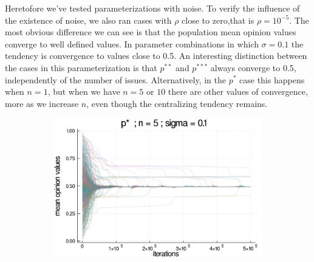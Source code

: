 \documentclass{article}
\begin{document}
    Heretofore we've tested parameterizations with noise. To verify the
    influence of the existence of noise, we also ran cases with \(\rho\) close to
    zero,that is \(\rho = 10^{-5} \). The most obvious difference we can see is
    that the population mean opinion values converge to well defined values. In
    parameter combinations in which \(\sigma = 0.1\) the tendency is convergence
    to values close to 0.5. An interesting distinction between the cases in this
    parameterization is that \(p^{**}\) and \(p^{***}\) always converge to 0.5,
    independently of the number of issues. Alternatively, in the \(p^{*}\) case
    this happens when \(n=1\), but when we have \(n=5\) or \(10\) there are
    other values of convergence, more as we increase \(n\), even though the
    centralizing tendency remains.
    \begin{figure}[H]
      \centering
      \begin{subfigure}[b]{0.48\textwidth}
        \includegraphics[width=\textwidth]{img/series/tseries4/Poodlcalculatepsn5-rho10e-5-sigma01-00intransrandom.png}
      \end{subfigure}
      \begin{subfigure}[b]{0.48\textwidth}

\end{subfigure}
\end{figure}
\end{document}
